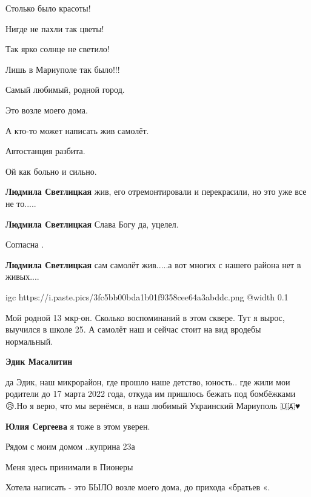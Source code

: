  
 
 
 
 

\qqSecCmt


Столько было красоты!

Нигде не пахли так цветы!

Так ярко солнце не светило!

Лишь в Мариуполе так было!!!


Самый любимый, родной город.


Это возле моего дома.


А кто-то может написать жив самолёт.

Автостанция разбита.

Ой как больно и сильно.

\begin{itemize} %
\textbf{Людмила Светлицкая} жив, его отремонтировали и перекрасили, но это уже все не то.....

\textbf{Людмила Светлицкая} Слава Богу да, уцелел.

Согласна
.

\textbf{Людмила Светлицкая} сам самолёт жив.....а вот многих с нашего района нет в живых....
\end{itemize} %


\ifcmt
  igc https://i.paste.pics/3fc5bb00bda1b01f9358cee64a3abddc.png
	@width 0.1
\fi


Мой родной 13 мкр-он. Сколько воспоминаний в этом сквере. Тут я вырос, выучился
в школе 25. А самолёт наш и сейчас стоит на вид вродебы нормальный.

\begin{itemize} %
\textbf{Эдик Масалитин} 

да Эдик, наш микрорайон, где прошло наше детство, юность.. где жили мои родители до
17 марта 2022 года, откуда им пришлось бежать под бомбёжками 😥.Но я верю, что мы
вернёмся, в наш любимый Украинский Мариуполь 🇺🇦♥️

\textbf{Юлия Сергеева} я тоже в этом уверен.
\end{itemize} %


Рядом с моим домом ..куприна 23а


Меня здесь принимали в Пионеры


Хотела написать - это БЫЛО возле моего дома, до прихода «братьев «.

